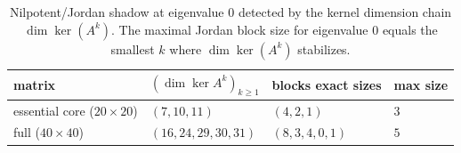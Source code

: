 \begin{table}[H]
\centering
\scriptsize
\setlength{\tabcolsep}{6pt}
\caption{Nilpotent/Jordan shadow at eigenvalue $0$ detected by the kernel dimension chain $\dim\ker(A^k)$. The maximal Jordan block size for eigenvalue $0$ equals the smallest $k$ where $\dim\ker(A^k)$ stabilizes.}
\label{tab:real_input_40_nilpotent_jordan}
\begin{tabular}{l l l l}
\toprule
matrix & $(\dim\ker A^k)_{k\ge1}$ & blocks exact sizes & max size\\
\midrule
essential core ($20\times20$) & $(7,10,11)$ & $(4,2,1)$ & $3$\\
full ($40\times40$) & $(16,24,29,30,31)$ & $(8,3,4,0,1)$ & $5$\\
\bottomrule
\end{tabular}
\end{table}
